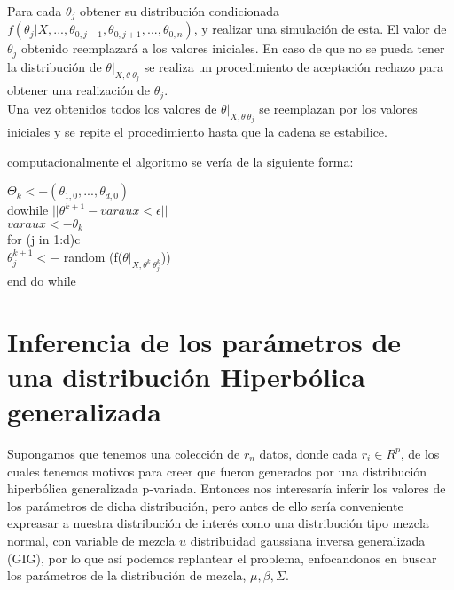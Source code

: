 \documentclass[11pt]{book}
\begin{document}
Para cada $\theta_{j}$ obtener su distribución condicionada  $f(\theta_{j} |X,...,\theta_{0,j-1},\theta_{0,j+1},...,\theta_{0,n})$, y realizar una simulación de esta. El valor de $\theta_{j}$ obtenido reemplazará a los valores iniciales. En caso de que no se pueda tener la distribución de $\theta|_{X,\theta \ \theta_{j}}$ se realiza un procedimiento de aceptación rechazo para obtener una realización de $\theta_{j}$.\\

Una vez obtenidos todos los valores de $\theta|_{X,\theta \ \theta_{j}}$ se reemplazan por los valores iniciales y se repite el procedimiento hasta que la cadena se estabilice.

computacionalmente el algoritmo se vería de la siguiente forma:\\
\begin{center}
	$\Theta_{k} <- (\theta_{1,0},...,\theta_{d,0})$\\
	do{while $||\theta^{k+1}-varaux< \epsilon || $ }\\
		$varaux<-\theta_{k}	$\\
		for (j in 1:d)c\\
			$\theta_{j} ^{k+1}<-$ random (f($\theta|_{X,\theta^{k} \ \theta_{j} ^{k}}$))\\
		              
	end do while\\
\end{center}
									

\section*{Inferencia de los parámetros de una distribución Hiperbólica generalizada}

Supongamos que tenemos una colección de $r_{n}$ datos, donde cada $r_{i}\in R^{p}$, de los cuales tenemos motivos para creer que fueron generados por una distribución hiperbólica generalizada p-variada. Entonces nos interesaría inferir los valores de los parámetros de dicha distribución, pero antes de ello sería conveniente expreasar a nuestra distribución de interés como una distribución tipo mezcla normal, con variable de mezcla $u$ distribuidad gaussiana inversa generalizada (GIG), por lo que así podemos replantear el problema, enfocandonos en buscar los parámetros de la distribución de mezcla, $\mu,\beta,\Sigma$.\\
\end{document}
